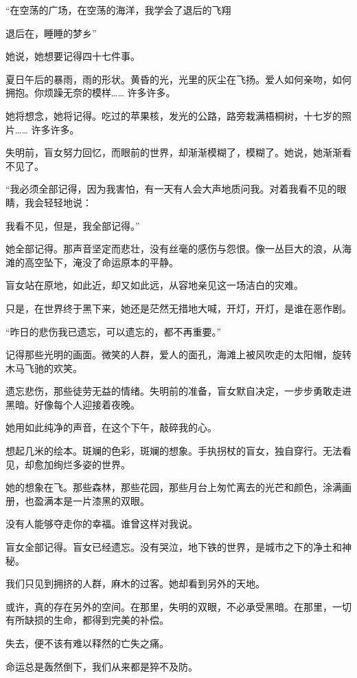 		“在空荡的广场，在空荡的海洋，我学会了退后的飞翔\par
		退后在，睡睡的梦乡”

		她说，她想要记得四十七件事。\par
		夏日午后的暴雨，雨的形状。黄昏的光，光里的灰尘在飞扬。爱人如何亲吻，如何拥抱。你烦躁无奈的模样…… 许多许多。\par
		她将想念，她将记得。吃过的苹果核，发光的公路，路旁栽满梧桐树，十七岁的照片…… 许多许多。\par
		失明前，盲女努力回忆，而眼前的世界，却渐渐模糊了，模糊了。她说，她渐渐看不见了。

		“我必须全部记得，因为我害怕，有一天有人会大声地质问我。对着我看不见的眼睛，我会轻轻地说：\par
		我看不见，但是，我全部记得。”

		她全部记得。那声音坚定而悲壮，没有丝毫的感伤与怨恨。像一丛巨大的浪，从海滩的高空坠下，淹没了命运原本的平静。\par
		盲女站在原地，如此近，却又如此远，从容地亲见这一场洁白的灾难。\par
		只是，在世界终于黑下来，她还是茫然无措地大喊，开灯，开灯，是谁在恶作剧。

		“昨日的悲伤我已遗忘，可以遗忘的，都不再重要。”

		记得那些光明的画面。微笑的人群，爱人的面孔，海滩上被风吹走的太阳帽，旋转木马飞驰的欢笑。\par
		遗忘悲伤，那些徒劳无益的情绪。失明前的准备，盲女默自决定，一步步勇敢走进黑暗。好像每个人迎接着夜晚。\par
		她用如此纯净的声音，在这个下午，敲碎我的心。

		想起几米的绘本。斑斓的色彩，斑斓的想象。手执拐杖的盲女，独自穿行。无法看见，却愈加绚烂多姿的世界。\par
		她的想象在飞。那些森林，那些花园，那些月台上匆忙离去的光芒和颜色，涂满画册，也盈满本是一片漆黑的双眼。\par
		没有人能够夺走你的幸福。谁曾这样对我说。\par
		盲女全部记得。盲女已经遗忘。没有哭泣，地下铁的世界，是城市之下的净土和神秘。\par
		我们只见到拥挤的人群，麻木的过客。她却看到另外的天地。\par
		或许，真的存在另外的空间。在那里，失明的双眼，不必承受黑暗。在那里，一切有所缺损的生命，都得到完美的补偿。\par
		失去，便不该有难以释然的亡失之痛。\par
		命运总是轰然倒下，我们从来都是猝不及防。

